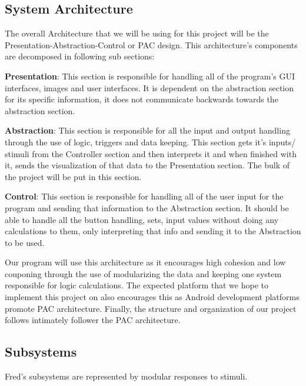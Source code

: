 \documentclass[]{article}
\begin{document}
\subsection{System Architecture}
\label{sub:system_architecture}

	The overall Architecture that we will be using for this project will be the Presentation-Abstraction-Control or PAC design. This architecture’s components are decomposed in following sub sections:

\textbf{Presentation}: This section is responsible for handling all of the program’s GUI interfaces, images and user interfaces. It is dependent on the abstraction section for its specific information, it does not communicate backwards towards the abstraction section.

\textbf{Abstraction}: This section is responsible for all the input and output handling through the use of logic, triggers and data keeping. This section gets it’s inputs/ stimuli from the Controller section and then interprets it and when finished with it, sends the visualization of that data to the Presentation section. The bulk of the project will be put in this section.

\textbf{Control}: This section is responsible for handling all of the user input for the program and sending that information to the Abstraction section. It should be able to handle all the button handling, sets, input values without doing any calculations to them, only interpreting that info and sending it to the Abstraction to be used.

	Our program will use this architecture as it encourages high cohesion and low couponing through the use of modularizing the data and keeping one system responsible for logic calculations. The expected platform that we hope to implement this project on also encourages this as Android development platforms promote PAC architecture. Finally, the structure and organization of our project follows intimately follower the PAC architecture.


\subsection{Subsystems}
\label{sub:subsystems}

Fred's subsystems are represented by modular responses to stimuli.
\end{document}
